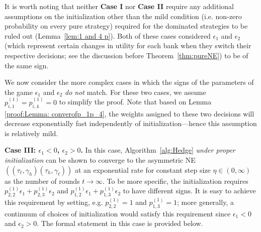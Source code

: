 It is worth noting that neither \textbf{Case I} nor \textbf{Case II} require any additional assumptions on the initialization other than the mild condition (i.e. non-zero probability on every pure strategy) required for the dominated strategies to be ruled out (Lemma~\ref{lem:1 and 4 p}).
Both of these cases considered $\epsilon_1$ and $\epsilon_2$ (which represent certain changes in utility for each bank when they switch their respective decisions; see the discussion before Theorem~\ref{thm:pureNE}) to be of the same sign.

We now consider the more complex cases in which the signs of the parameters of the game $\epsilon_1$ and $\epsilon_2$ \emph{do not} match.
For these two cases, we assume $p^{(1)}_{i,1}=p^{(1)}_{i,4}=0$ to simplify the proof. Note that based on Lemma \ref{proof:Lemma: converofp_1p_4}, the weights assigned to these two decisions will decrease exponentially fast independently of initialization---hence this assumption is relatively mild.


\noindent \textbf{Case III: $\epsilon_1<0$, $\epsilon_2>0$.} 
In this case, Algorithm~\ref{alg:Hedge} \emph{under proper initialization} can be shown to converge to the asymmetric NE $((\tau_{\ell},\gamma_{h})(\tau_{h},\gamma_{\ell}))$ at an exponential rate for constant step size $\eta \in (0,\infty)$ as the number of rounds $t \to \infty$.
To be more specific, the initialization requires $p^{(1)}_{2,2}\epsilon_1+p^{(1)}_{2,3}\epsilon_2$ and $p^{(1)}_{1,2}\epsilon_1+p^{(1)}_{1,3}\epsilon_2$ to have different signs. 
It is easy to achieve this requirement by setting, e.g. $p^{(1)}_{2,2} = 1$ and $p^{(1)}_{1,3} = 1$; more generally, a continuum of choices of initialization would satisfy this requirement since $\epsilon_1 < 0$ and $\epsilon_2 > 0$.
The formal statement in this case is provided below.


